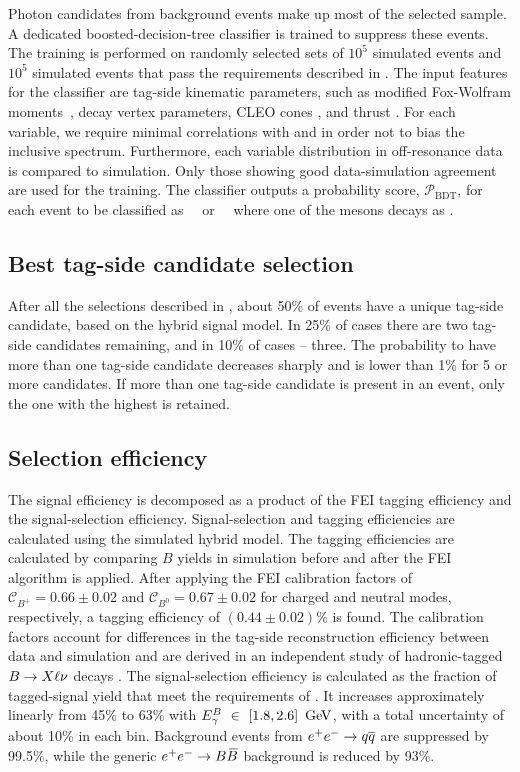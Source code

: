 Photon candidates from background \epem\ra\qqbar events make up most of the selected sample. A dedicated boosted-decision-tree classifier is trained to suppress these events. The training is performed on randomly selected sets of $10^5$ simulated \qqbar events and $10^5$ simulated \BtoXsgamma events that pass the requirements described in . The input features for the classifier are tag-side \B kinematic parameters, such as modified Fox-Wolfram moments~\cite{KSFW_moments}, \B decay vertex parameters, CLEO cones \cite{CLEO_cones}, and thrust \cite{BaBar:2014omp}. For each variable, we require minimal correlations with \EB and \Mbc in order not to bias the inclusive spectrum. Furthermore, each variable distribution in off-resonance data is compared to \epem\ra\qqbar simulation. Only those showing good data-simulation agreement are used for the training. The classifier outputs a probability score, $\mathcal{P}_{\mathrm{BDT}}$, for each event to be classified as \epem~\ra~\qqbar or \epem~\ra~\BB where one of the \B mesons decays as \BtoXsgamma. 

\subsection{Best tag-side candidate selection}\label{sec:best_tag_candidate}

After all the selections described in , about 50\% of events have a unique tag-side candidate, based on the hybrid signal model. In 25\% of cases there are two tag-side candidates remaining, and in 10\% of cases -- three. The probability to have more than one tag-side candidate decreases sharply and is lower than 1\% for 5 or more candidates. If more than one tag-side candidate is present in an event, only the one with the highest \feiProb is retained. 

\subsection{Selection efficiency}

The signal efficiency is decomposed as a product of the FEI tagging efficiency and the signal-selection efficiency. Signal-selection and tagging efficiencies are calculated using the simulated hybrid model. The tagging efficiencies are calculated by comparing $B$ yields in simulation before and after the FEI algorithm is applied. After applying the FEI calibration factors of $\mathcal{C}_{B^+}=0.66 \pm 0.02$ and $\mathcal{C}_{B^0}=0.67 \pm 0.02$ for charged and neutral modes, respectively, a tagging efficiency of $(0.44\pm0.02)\%$ is found. The calibration factors account for differences in the tag-side reconstruction efficiency between data and simulation and are derived in an independent study of hadronic-tagged $B\rightarrow X\ell\nu$ decays \cite{Belle-II:2020fst}. The signal-selection efficiency is calculated as the fraction of tagged-signal yield that meet the requirements of . It increases approximately linearly from 45\% to 63\% with ${E^B_{\gamma}}~\in~[1.8,2.6]~\mathrm{\,Ge\kern -0.1em V}$, with a total uncertainty of about 10\% in each bin. Background events from $e^+e^-\rightarrow q\overline q$ are suppressed by 99.5\%, while the generic $e^+e^-\rightarrow B\kern 0.18em\overline{\kern -0.18em B}{}$ background is reduced by 93\%.